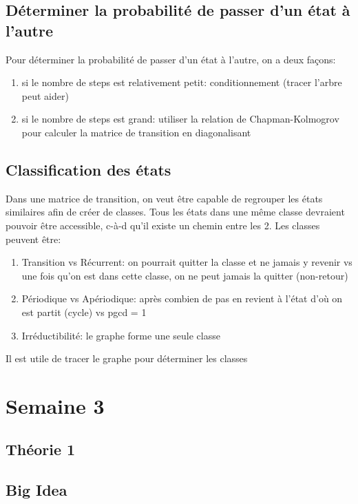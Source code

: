 \documentclass{article}
\begin{document}
\subsection{Déterminer la probabilité de passer d'un état à l'autre}

Pour déterminer la probabilité de passer d'un état à l'autre, on a deux
façons:
\begin{enumerate}
    \item si le nombre de steps est relativement petit: conditionnement
	(tracer l'arbre peut aider)
    \item si le nombre de steps est grand: utiliser la relation de
	Chapman-Kolmogrov pour calculer la matrice de transition en
	diagonalisant
\end{enumerate}

\subsection{Classification des états}

Dans une matrice de transition, on veut être capable de regrouper les
états similaires afin de créer de classes. Tous les états dans une
même classe devraient pouvoir être accessible, c-à-d qu'il existe un
chemin entre les 2. Les classes peuvent être:
\begin{enumerate}
    \item Transition vs Récurrent: on pourrait quitter la classe et ne
	jamais y revenir vs une fois qu'on est dans cette classe, on
	ne peut jamais la quitter (non-retour)
    \item Périodique vs Apériodique: après combien de pas en revient
	à l'état d'où on est partit (cycle) vs pgcd = 1
    \item Irréductibilité: le graphe forme une seule classe
\end{enumerate}

\begin{remark}
    Il est utile de tracer le graphe pour déterminer les classes
\end{remark}

\pagebreak
\section{Semaine 3}
\subsection{Théorie 1}
\subsection*{Big Idea}
\end{document}
